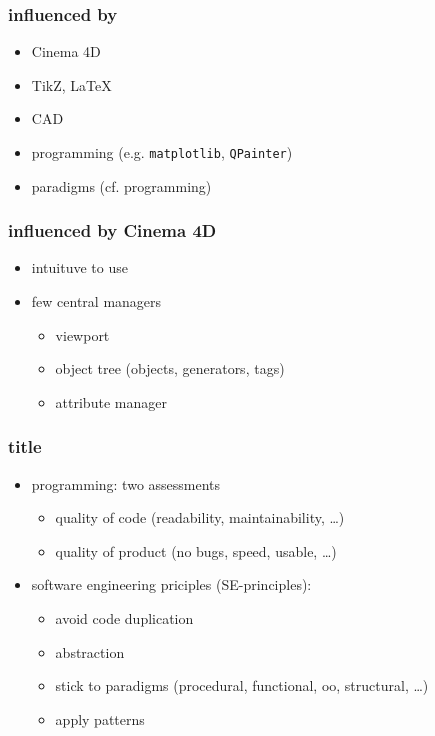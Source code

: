 \documentclass{beamer}
\begin{document}
\begin{frame}[t]\frametitle{influenced by}
\begin{itemize}
  \item Cinema 4D
  \item TikZ, \LaTeX
  \item CAD
  \item programming (e.g. \texttt{matplotlib}, \texttt{QPainter})
  \item paradigms (cf. programming)
\end{itemize}
\end{frame}

\begin{frame}[t]\frametitle{influenced by Cinema 4D}
\begin{itemize}
  \item intuituve to use
  \item few central managers
  \begin{itemize}
    \item viewport
    \item object tree (objects, generators, tags)
    \item attribute manager
  \end{itemize}
\end{itemize}
\end{frame}

\begin{frame}[t]\frametitle{title}
\begin{itemize}
  \item programming: two assessments
  \begin{itemize}
    \item quality of code (readability, maintainability, \dots)
    \item quality of product (no bugs, speed, usable, \dots)
  \end{itemize}
  \item software engineering priciples (SE-principles):
  \begin{itemize}
    \item avoid code duplication
    \item abstraction
    \item stick to paradigms (procedural, functional, oo, structural, \dots)
    \item apply patterns
  \end{itemize}
\end{itemize}
\end{frame}
\end{document}
